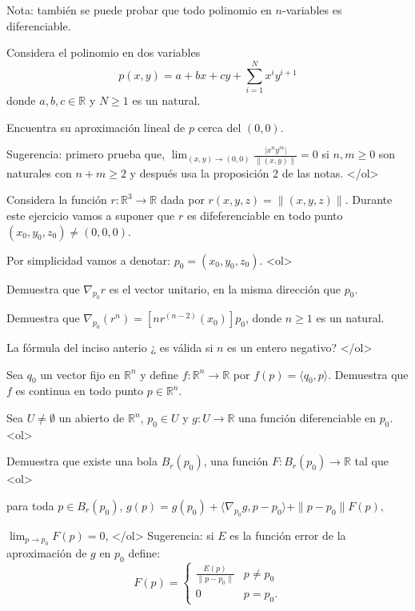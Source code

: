 \documentclass{article}
\theoremstyle{definition}
\begin{document}
              
              Nota: también se puede probar que todo polinomio en $n$-variables es diferenciable.
              
            \item Considera el polinomio en dos variables
              $$p(x,y)= a + bx+ cy + \sum_{i=1}^N x^{i}y^{i+1}$$
              donde $a,b,c\in \mathbb{R}$ y $N\geq 1$ es un natural.
              
              Encuentra su aproximación lineal de $p$ cerca del $(0,0)$.

              Sugerencia: primero prueba que, $\lim_{(x,y)\to (0,0)} \frac{|x^ny^m|}{\|(x,y)\|}=0$ si
              $n,m\geq0$ son naturales con $n+m\geq 2$ y después usa la proposición 2 de las notas.
            </ol>

            
             \item Considera  la función  $r:\mathbb{R}^3 \to \mathbb{R}$ dada por $r(x,y,z)=\|(x,y,z)\|$. Durante
            este ejercicio vamos a suponer que $r$ es difeferenciable en todo punto $(x_0,y_0,z_0)\ne (0,0,0)$.

            Por simplicidad vamos a denotar: $p_0=(x_0,y_0,z_0)$.
            <ol>
            \item Demuestra que $\nabla_{p_0}r$ es el  vector unitario, en la misma dirección que
              $p_0$.
            \item Demuestra que $\nabla_{p_0}(r^n)=[nr^{(n-2)}(x_0)]p_0$, donde $n \geq 1$ es un natural.
            \item La fórmula del inciso anterio ¿ es válida si $n$ es un entero negativo?
            </ol>
         
  
          \item Sea $q_0$ un vector fijo en $\mathbb{R}^n$ y define $f:\mathbb{R}^n \to \mathbb{R}$
            por $f(p)=\langle q_0, p \rangle$. Demuestra que $f$ es continua en todo punto $p \in \mathbb{R}^n$.
           \item\label{Ejer:AproxLinealReglaCadena} 
            Sea $U\ne \emptyset$ un abierto de $\mathbb{R}^n$, $p_0\in U $ y $g:U \to \mathbb{R}$
            una función diferenciable en $p_0$.
            <ol>
            \item Demuestra que existe una bola $B_r(p_0)$, una función
              $F:B_{r}(p_0) \to \mathbb{R}$ tal que
              <ol>
              \item para toda $p\in B_r(p_0)$, $g(p)=g(p_0)+\langle \nabla_{p_0}g, p-p_0\rangle +\|p-p_0\|F(p)$,
              \item $\lim_{p\to p_0}F(p)=0$,
              </ol>
              Sugerencia: si $E$ es la función error de la aproximación de $g$ en $p_0$ define:
              $$
              F(p)=\left\{
                \begin{array}{cc}
                  \frac{E(p)}{\|p-p_0\|} & p\ne p_0 \\
                  0 & p=p_0.
                \end{array}
              \right.
              $$
\end{document}
